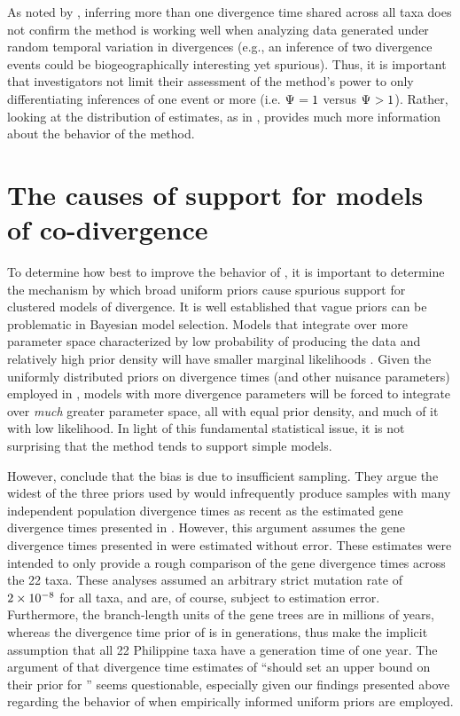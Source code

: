As noted by \citet{Oaks2012}, inferring more than one divergence time
shared across all taxa does not confirm the method is working well when
analyzing data generated under random temporal variation in divergences (e.g.,
an inference of two divergence events could be biogeographically interesting
yet spurious).
Thus, it is important that investigators not limit their assessment of the
method's power to only differentiating inferences of one event or more (i.e.
$\Psi_{} = 1$ versus $\Psi_{} > 1$).
Rather, looking at the distribution of estimates, as in \citet{Oaks2012},
provides much more information about the behavior of the method.



\section{The causes of support for models of co-divergence}
To determine how best to improve the behavior of \msb, it is important to
determine the mechanism by which broad uniform priors cause spurious support
for clustered models of divergence.
It is well established that vague priors can be problematic in Bayesian model
selection.
Models that integrate over more parameter space characterized by low
probability of producing the data and relatively high prior density will have
smaller marginal likelihoods \citep{Jeffreys1939,Lindley1957}.
Given the uniformly distributed priors on divergence times (and other nuisance
parameters) employed in \msb, models with more divergence parameters will be
forced to integrate over \emph{much} greater parameter space, all with equal
prior density, and much of it with low likelihood.
In light of this fundamental statistical issue, it is not surprising that the
method tends to support simple models.

However, \citet{Hickerson2013} conclude that the bias is due to insufficient
sampling.
They argue the widest of the three priors used by \citet{Oaks2012} would
infrequently produce samples with many independent population divergence times
as recent as the estimated gene divergence times presented in \citet{Oaks2012}.
However, this argument assumes the gene divergence times presented in
\citet{Oaks2012} were estimated without error.
These estimates were intended to only provide a rough comparison of the
gene divergence times across the 22 taxa.
These analyses assumed an arbitrary strict mutation rate of $2\times 10^{-8}$ for all
taxa, and are, of course, subject to estimation error.
Furthermore, the branch-length units of the gene trees are in millions of
years, whereas the divergence time prior of \msb is in generations, thus
\citet{Hickerson2013} make the implicit assumption that all 22 Philippine taxa
have a generation time of one year.
The argument of \citet{Hickerson2013} that divergence time estimates of
\citet{Oaks2012} ``should set an upper bound on their prior for \divt{}'' seems
questionable, especially given our findings presented above regarding the
behavior of \msb when empirically informed uniform priors are employed.

